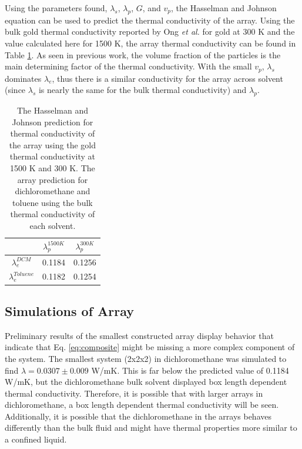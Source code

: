 Using the parameters found, $\lambda_s$, $\lambda_p$, $G$, and $v_p$, the Hasselman and Johnson equation can be used to predict the thermal conductivity of the array.
Using the bulk gold thermal conductivity reported by Ong \textit{et al.} for gold at 300 K and the value calculated here for 1500 K, the array thermal conductivity can be found in Table \ref{tab:predition}.
As seen in previous work,\cite{Ong:2014yq, Liu2015, Zanjani2014} the volume fraction of the particles is the main determining factor of the thermal conductivity. 
With the small $v_p$, $\lambda_s$ dominates $\lambda_e$, thus there is a similar conductivity for the array across solvent (since $\lambda_s$ is nearly the same for the bulk thermal conductivity) and $\lambda_p$.

\begin{table}[]
    \centering
    \begin{tabular}{c|c|c}
    \toprule
         &$\lambda_p^{1500 K}$ & $\lambda_p^{300 K}$  \\
         \hline
         $\lambda_e^{DCM}$& 0.1184& 0.1256\\
         $\lambda_e^{Toluene}$ & 0.1182 & 0.1254 \\
         \bottomrule
    \end{tabular}
    \caption{The Hasselman and Johnson prediction for thermal conductivity of the  array using the gold thermal conductivity at 1500 K and 300 K. The array prediction for dichloromethane and toluene using the bulk thermal conductivity of each solvent.}
    \label{tab:predition}
\end{table}

\subsection{Simulations of Array}
Preliminary results of the smallest constructed array display behavior that indicate that Eq. \ref{eq:composite} might be missing a more complex component of the system.
The smallest system (2x2x2) in dichloromethane was simulated to find $\lambda = 0.0307 \pm 0.009$ W/mK. 
This is far below the predicted value of 0.1184 W/mK, but the dichloromethane bulk solvent displayed box length dependent thermal conductivity.
Therefore, it is possible that with larger arrays in dichloromethane, a box length dependent thermal conductivity will be seen. 
Additionally, it is possible that the dichloromethane in the arrays behaves differently than the bulk fluid and might have thermal properties more similar to a confined liquid.

